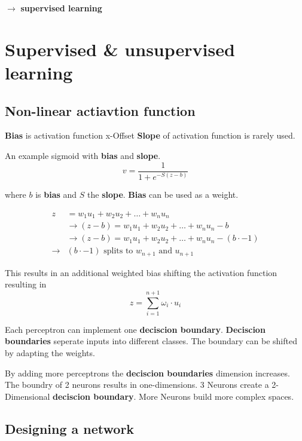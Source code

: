 \documentclass[
    fontsize      = 11pt,
    paper         = a4,
    twoside       = false,
    parskip       = half,
    pagesize      = false,
]{scrartcl}
\begin{document}
\(\rightarrow\) \textbf{supervised learning}

\clearpage
\newpage

\hypertarget{supervised-unsupervised-learning}{%
\section{Supervised \& unsupervised
learning}\label{supervised-unsupervised-learning}}

\hypertarget{non-linear-actiavtion-function}{%
\subsection{Non-linear actiavtion
function}\label{non-linear-actiavtion-function}}

\textbf{Bias} is activation function x-Offset \textbf{Slope} of
activation function is rarely used.

An example sigmoid with \textbf{bias} and \textbf{slope}.
\[v =  \frac{1}{1+e^{-S(z-b)}}\]

where \(b\) is \textbf{bias} and \(S\) the \textbf{slope}. \textbf{Bias}
can be used as a weight.

\begin{align*}
z &= w_1u_1 + w_2u_2 + \ldots + w_nu_n \\
& \rightarrow (z-b) = w_1u_1 + w_2u_2 + \ldots + w_nu_n - b\\
& \rightarrow (z-b) = w_1u_1 + w_2u_2 + \ldots + w_nu_n - (b \cdot -1)\\[2ex]
\rightarrow & (b \cdot -1) \text{ splits to } w_{n+1} \text{ and } u_{n+1}
\end{align*}

This results in an additional weighted bias shifting the activation
function resulting in \[z = \sum_{i=1}^{n+1}\omega_i \cdot u_i\]

Each perceptron can implement one \textbf{deciscion boundary}.
\textbf{Deciscion boundaries} seperate inputs into different classes.
The boundary can be shifted by adapting the weights.

By adding more perceptrons the \textbf{deciscion boundaries} dimension
increases. The boundry of 2 neurons results in one-dimensions. 3 Neurons
create a 2-Dimensional \textbf{deciscion boundary}. More Neurons build
more complex spaces.

\hypertarget{designing-a-network}{%
\subsection{Designing a network}\label{designing-a-network}}
\end{document}
